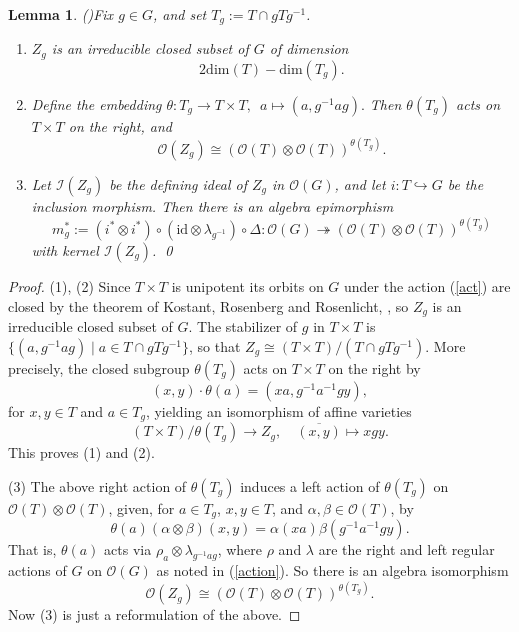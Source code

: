 \documentclass{amsart}
\numberwithin{equation}{section}
\newtheorem{lemma}[theorem]{Lemma}
\theoremstyle{definition}
\begin{document}
\begin{lemma}{\rm (\cite[\S 4]{G2})}\label{doubles} 
Fix $g \in G$, and set $T_g := T \cap gTg^{-1}$.
\begin{enumerate}
\item $Z_g$ is an irreducible closed subset of $G$ of dimension
$$ 2\mathrm{dim}(T) - \mathrm{dim}(T_g ).$$
\item Define the embedding $ \theta: T_g \rightarrow T\times T,\,\,\,a \mapsto (a,g^{-1}ag).$ Then $\theta(T_g)$ acts on $T \times T$ on the right, and 
$$ \mathcal{O}(Z_g) \cong  (\mathcal{O}(T) \otimes \mathcal{O}(T))^{\theta(T_g)}. $$
\item Let $\mathcal{I}(Z_g)$ be the defining ideal of $Z_g$ in $\mathcal{O}(G)$, and let $i:T\hookrightarrow G$ be the inclusion morphism. Then there is an algebra epimorphism
$$ m_g^{\ast} := (i^{\ast} \otimes i^{\ast})\circ(\mathrm{id} \otimes \lambda_{g^{-1}})\circ \Delta : \mathcal{O}(G) \twoheadrightarrow \left(\mathcal{O}(T) \otimes \mathcal{O}(T)\right)^{\theta(T_g)}$$
with kernel $\mathcal{I}(Z_g)$. \qed
\end{enumerate}
\end{lemma}

\begin{proof} 
(1), (2)  Since $T \times T$ is unipotent its orbits on $G$ under the action (\ref{act}) are closed by the theorem of Kostant, Rosenberg and Rosenlicht, \cite[Theorem 17.64]{Mi}, so $Z_g$ is an irreducible closed subset of $G$. The stabilizer of $g$ in $T \times T$ is $\{(a,g^{-1}ag)\mid a \in T \cap gTg^{-1}\}$, so that $Z_g \cong (T \times T)/(T \cap gTg^{-1})$. More precisely, the closed subgroup $\theta(T_g)$ acts on $T \times T$ on the right by
$$ (x,y)\cdot \theta(a) = (xa, g^{-1}a^{-1}gy),$$
for $x,y \in T$ and  $a \in T_g$, yielding an isomorphism of affine varieties
$$ (T \times T)/\theta(T_g) \rightarrow Z_g, \quad \overline{(x,y)}\mapsto xgy.$$
This proves (1) and (2).

(3) The above right action of $\theta(T_g)$ induces a left action of $\theta(T_g)$ on $\mathcal{O}(T)\otimes \mathcal{O}(T)$, given, for $a \in T_g$, $x,y \in T$, and $\alpha, \beta \in \mathcal{O}(T)$, by 
$$ \theta(a)(\alpha \otimes \beta)(x,y)=\alpha(xa)\beta(g^{-1}a^{-1}gy). $$ 
That is, $\theta(a)$ acts via $\rho_a \otimes \lambda_{g^{-1}ag}$, where $\rho$ and $\lambda$ are the right and left regular actions of $G$ on $\mathcal{O}(G)$ as noted in (\ref{action}). So there is an algebra isomorphism
$$ \mathcal{O}(Z_g) \cong (\mathcal{O}(T) \otimes \mathcal{O}(T))^{\theta(T_g)}.$$ 
Now (3) is just a reformulation of the above.
\end{proof}
\end{document}
